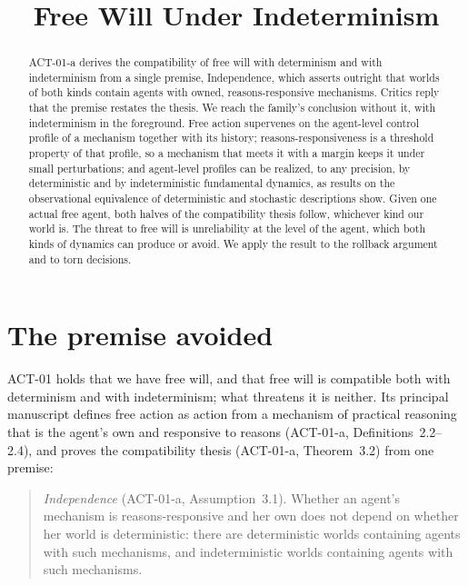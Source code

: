 \documentclass{situationist-preprint}
\title{Free Will Under Indeterminism}
\begin{document}
\maketitle

\begin{abstract}
ACT-01-a derives the compatibility of free will with determinism and with indeterminism from a single premise, Independence, which asserts outright that worlds of both kinds contain agents with owned, reasons-responsive mechanisms. Critics reply that the premise restates the thesis. We reach the family's conclusion without it, with indeterminism in the foreground. Free action supervenes on the agent-level control profile of a mechanism together with its history; reasons-responsiveness is a threshold property of that profile, so a mechanism that meets it with a margin keeps it under small perturbations; and agent-level profiles can be realized, to any precision, by deterministic and by indeterministic fundamental dynamics, as results on the observational equivalence of deterministic and stochastic descriptions show. Given one actual free agent, both halves of the compatibility thesis follow, whichever kind our world is. The threat to free will is unreliability at the level of the agent, which both kinds of dynamics can produce or avoid. We apply the result to the rollback argument and to torn decisions.
\end{abstract}

\section{The premise avoided}\label{s:avoid}

ACT-01 holds that we have free will, and that free will is compatible both with determinism and with indeterminism; what threatens it is neither. Its principal manuscript defines free action as action from a mechanism of practical reasoning that is the agent's own and responsive to reasons (ACT-01-a, Definitions~2.2--2.4), and proves the compatibility thesis (ACT-01-a, Theorem~3.2) from one premise:

\begin{quote}
\emph{Independence} (ACT-01-a, Assumption~3.1). Whether an agent's mechanism is reasons-responsive and her own does not depend on whether her world is deterministic: there are deterministic worlds containing agents with such mechanisms, and indeterministic worlds containing agents with such mechanisms.
\end{quote}
\end{document}

